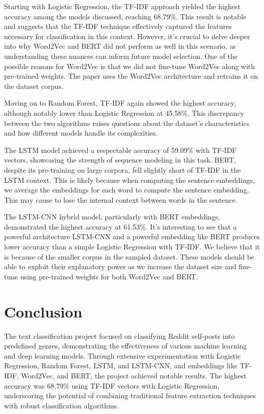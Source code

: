 \documentclass[conference]{IEEEtran}
\begin{document}
Starting with Logistic Regression, the TF-IDF approach yielded the highest accuracy among the models discussed, reaching 68.79\%. This result is notable and suggests that the TF-IDF technique effectively captured the features necessary for classification in this context. However, it's crucial to delve deeper into why Word2Vec and BERT did not perform as well in this scenario, as understanding these nuances can inform future model selection. One of the possible reasons for Word2Vec is that we did not fine-tune Word2Vec along with pre-trained weights. The paper uses the Word2Vec architecture and retrains it on the dataset corpus. 

Moving on to Random Forest, TF-IDF again showed the highest accuracy, although notably lower than Logistic Regression at 45.58\%. This discrepancy between the two algorithms raises questions about the dataset's characteristics and how different models handle its complexities.

The LSTM model achieved a respectable accuracy of 59.09\% with TF-IDF vectors, showcasing the strength of sequence modeling in this task. BERT, despite its pre-training on large corpora, fell slightly short of TF-IDF in the LSTM context. This is likely because when computing the sentence embeddings, we average the embeddings for each word to compute the sentence embedding. This may cause to lose the internal context between words in the sentence.

The LSTM-CNN hybrid model, particularly with BERT embeddings, demonstrated the highest accuracy at 61.53\%. It's interesting to see that a powerful architecture LSTM-CNN and a powerful embedding like BERT produces lower accuracy than a simple Logistic Regression with TF-IDF. We believe that it is because of the smaller corpus in the sampled dataset. These models should be able to exploit their explanatory power as we increase the dataset size and fine-tune using pre-trained weights for both Word2Vec and BERT.

\section{Conclusion}

The text classification project focused on classifying Reddit self-posts into predefined genres, demonstrating the effectiveness of various machine learning and deep learning models. Through extensive experimentation with Logistic Regression, Random Forest, LSTM, and LSTM-CNN, and embeddings like TF-IDF, Word2Vec, and BERT, the project achieved notable results. The highest accuracy was 68.79\%  using TF-IDF vectors with Logistic Regression, underscoring the potential of combining traditional feature extraction techniques with robust classification algorithms.
\end{document}
